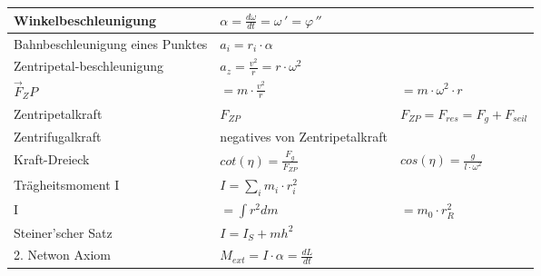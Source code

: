 \begin{tabularx}{\columnwidth}{@{}XXX@{}}
	Winkelbeschleunigung             & $ \alpha = \frac{d\omega}{dt} = \omega\,' = \varphi\,''$                                                      \\ \hline
	Bahnbeschleunigung eines Punktes & $a_i = r_i\cdot \alpha$                                                                                       \\ \hline
	Zentripetal-beschleunigung       & $a_z = \frac{v^2}{r} = r\cdot \omega^2$                                                                       \\ \hline
	$\vec{F}_ZP$                     & $= m\cdot \frac{v^2}{r}$                                             & $= m\cdot \omega^2\cdot r$             \\ \hline
	Zentripetalkraft                 & $F_{ZP}$                                                             & $F_{ZP} = F_{res} = F_g + F_{seil}$    \\\hline
	Zentrifugalkraft                 & negatives von Zentripetalkraft                                                                                \\ \hline
	Kraft-Dreieck                    & $cot(\eta) = \frac{F_g}{F_{ZP}}$                                     & $cos(\eta) = \frac{g}{l\cdot\omega^2}$ \\ \hline
	Trägheitsmoment I                & $I = \sum_{i} m_i\cdot r_i^2$                                                                                 \\ \hline
	I                                & $= \int r^2dm$                                                       & $= m_0\cdot r_R^2$                     \\ \hline
	Steiner'scher Satz               & $I = I_S + mh^2$                                                                                              \\ \hline
	2. Netwon Axiom                  & $M_{ext} = I \cdot \alpha = \frac{dL}{dt}$                                                                    \\ \hline
\end{tabularx}
\noindent
